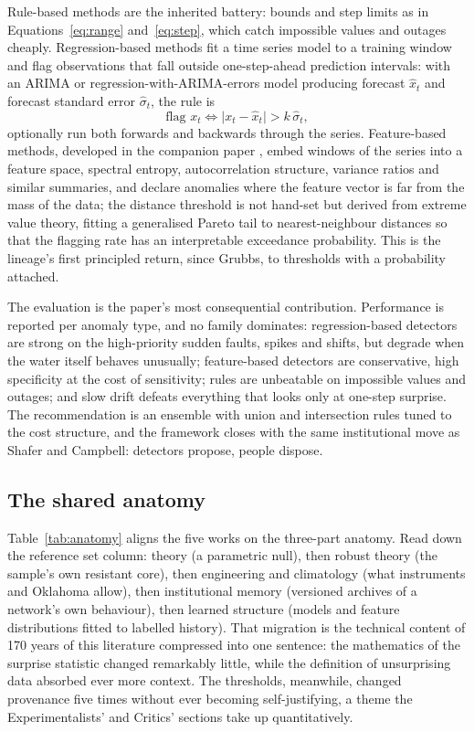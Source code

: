 Rule-based methods are the inherited battery: bounds and step limits as in
Equations~\eqref{eq:range} and~\eqref{eq:step}, which catch impossible
values and outages cheaply. Regression-based methods fit a time series model
to a training window and flag observations that fall outside one-step-ahead
prediction intervals: with an ARIMA or regression-with-ARIMA-errors model
producing forecast $\hat{x}_t$ and forecast standard error
$\hat{\sigma}_t$, the rule is
\begin{equation}
  \text{flag } x_t \iff
  \lvert x_t - \hat{x}_t \rvert > k\,\hat{\sigma}_t,
  \label{eq:regression}
\end{equation}
optionally run both forwards and backwards through the series. Feature-based
methods, developed in the companion paper \citep{talagala2019}, embed
windows of the series into a feature space, spectral entropy, autocorrelation
structure, variance ratios and similar summaries, and declare anomalies where
the feature vector is far from the mass of the data; the distance threshold
is not hand-set but derived from extreme value theory, fitting a generalised
Pareto tail to nearest-neighbour distances so that the flagging rate has an
interpretable exceedance probability. This is the lineage's first
principled return, since Grubbs, to thresholds with a probability attached.

The evaluation is the paper's most consequential contribution. Performance
is reported per anomaly type, and no family dominates: regression-based
detectors are strong on the high-priority sudden faults, spikes and shifts,
but degrade when the water itself behaves unusually; feature-based detectors
are conservative, high specificity at the cost of sensitivity; rules are
unbeatable on impossible values and outages; and slow drift defeats
everything that looks only at one-step surprise. The recommendation is an
ensemble with union and intersection rules tuned to the cost structure, and
the framework closes with the same institutional move as Shafer and
Campbell: detectors propose, people dispose.

\subsection{The shared anatomy}
\label{sec:tech-anatomy}

Table~\ref{tab:anatomy} aligns the five works on the three-part anatomy.
Read down the reference set column: theory (a parametric null), then robust
theory (the sample's own resistant core), then engineering and climatology
(what instruments and Oklahoma allow), then institutional memory (versioned
archives of a network's own behaviour), then learned structure (models and
feature distributions fitted to labelled history). That migration is the
technical content of 170 years of this literature compressed into one
sentence: the mathematics of the surprise statistic changed remarkably
little, while the definition of unsurprising data absorbed ever more
context. The thresholds, meanwhile, changed provenance five times without
ever becoming self-justifying, a theme the Experimentalists' and Critics'
sections take up quantitatively.

